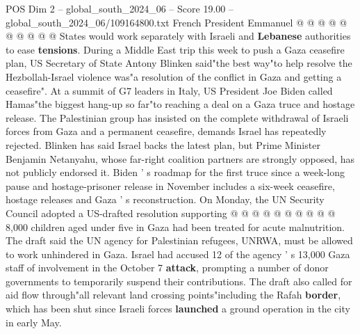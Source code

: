 \begin{textsample}{POS Dim 2 – global\_south\_2024\_06 – Score 19.00 – global\_south\_2024\_06/109164800.txt}
French President Emmanuel @ @ @ @ @ @ @ @ @ @ States would work separately with Israeli and \textbf{Lebanese} authorities to ease \textbf{tensions}.
During a Middle East trip this week to push a Gaza ceasefire plan, US Secretary of State Antony Blinken said"the best way"to help resolve the Hezbollah-Israel violence was"a resolution of the conflict in Gaza and getting a ceasefire".
At a summit of G7 leaders in Italy, US President Joe Biden called Hamas"the biggest hang-up so far"to reaching a deal on a Gaza truce and hostage release.
The Palestinian group has insisted on the complete withdrawal of Israeli forces from Gaza and a permanent ceasefire, demands Israel has repeatedly rejected.
Blinken has said Israel backs the latest plan, but Prime Minister Benjamin Netanyahu, whose far-right coalition partners are strongly opposed, has not publicly endorsed it.
Biden ' s roadmap for the first truce since a week-long pause and hostage-prisoner release in November includes a six-week ceasefire, hostage releases and Gaza ' s reconstruction.
On Monday, the UN Security Council adopted a US-drafted resolution supporting @ @ @ @ @ @ @ @ @ @ 8,000 children aged under five in Gaza had been treated for acute malnutrition.
The draft said the UN agency for Palestinian refugees, UNRWA, must be allowed to work unhindered in Gaza.
Israel had accused 12 of the agency ' s 13,000 Gaza staff of involvement in the October 7 \textbf{attack}, prompting a number of donor governments to temporarily suspend their contributions.
The draft also called for aid flow through"all relevant land crossing points"including the Rafah \textbf{border}, which has been shut since Israeli forces \textbf{launched} a ground operation in the city in early May.

\end{textsample}
